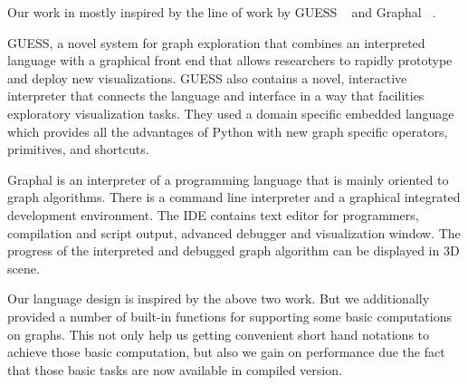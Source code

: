 Our work in mostly inspired by the line of work by GUESS ~\cite{Adar} and
Graphal ~\cite{Graphal}.

GUESS, a novel system for graph
exploration that combines an interpreted language with a
graphical front end that allows researchers to rapidly prototype
and deploy new visualizations. GUESS also contains a novel,
interactive interpreter that connects the language and interface in
a way that facilities exploratory visualization tasks. They used a domain 
specific embedded language
which provides all the advantages of Python with new graph
specific operators, primitives, and shortcuts.

Graphal is an interpreter of a programming language that is mainly oriented to
graph algorithms. There is a command line interpreter and a graphical
integrated development environment. The IDE contains text editor for
programmers, compilation and script output, advanced debugger and visualization
window. The progress of the interpreted and debugged graph algorithm can be
displayed in 3D scene.

Our language design is inspired by the above  two work. But we additionally provided
a number of built-in functions for supporting some basic computations on graphs. This not only help us getting
convenient short hand notations to achieve those basic computation, but also we gain on 
performance due the fact that those basic tasks are now available in compiled 
version.
